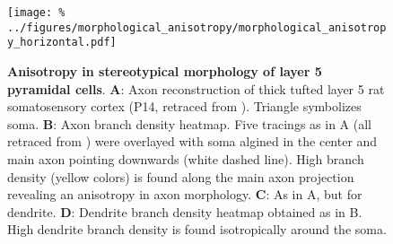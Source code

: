 \begin{figure}[h]
  \centering
  \texttt{[image: \%
    ../figures/morphological\_anisotropy/morphological\_anisotropy\_horizontal.pdf]} %
  \caption{\textbf{Anisotropy in stereotypical morphology of layer 5
      pyramidal cells}. \textbf{A}: Axon reconstruction of thick
    tufted layer 5 rat somatosensory cortex (P14, retraced from
    \textcite{Romand2011}). Triangle symbolizes soma. \textbf{B}: Axon
    branch density heatmap. Five tracings as in A (all retraced from
    \cite{Romand2011}) were overlayed with soma algined in the center
    and main axon pointing downwards (white dashed line). High branch
    density (yellow colors) is found along the main axon projection
    revealing an anisotropy in axon morphology. \textbf{C}: As in A,
    but for dendrite. \textbf{D}: Dendrite branch density heatmap
    obtained as in B. High dendrite branch density is found
    isotropically around the soma.}
  \label{fig:aniso_morph}
\end{figure}

